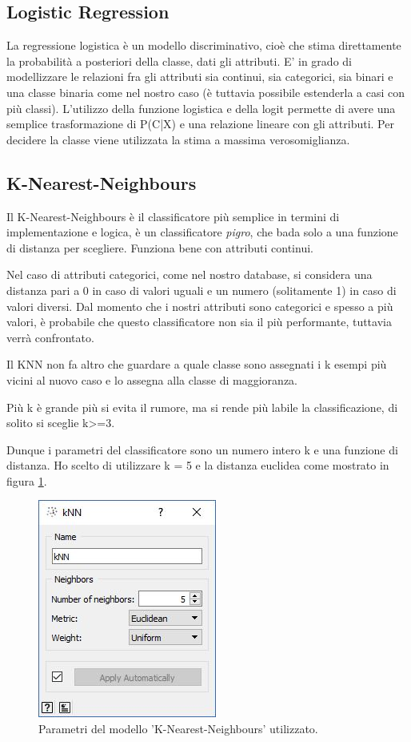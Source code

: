 \documentclass[a4paper, 12p]{report}
\begin{document}
	\subsection{Logistic Regression}
	La regressione logistica è un modello discriminativo, cioè che stima direttamente la probabilità a posteriori della classe, dati gli attributi. E' in grado di modellizzare le relazioni fra gli attributi sia continui, sia categorici, sia binari e una classe binaria come nel nostro caso (è tuttavia possibile estenderla a casi con più classi). L'utilizzo della funzione logistica e della logit permette di avere una semplice trasformazione di P(C|X) e una relazione lineare con gli attributi. Per decidere la classe viene utilizzata la stima a massima verosomiglianza.

	\subsection{K-Nearest-Neighbours}
	Il K-Nearest-Neighbours è il classificatore più semplice in termini di implementazione e logica, è un classificatore \emph{pigro}, che bada solo a una funzione di distanza per scegliere. Funziona bene con attributi continui. 
	
	Nel caso di attributi categorici, come nel nostro database, si considera una distanza pari a 0 in caso di valori uguali e un numero (solitamente 1) in caso di valori diversi. Dal momento che i nostri attributi sono categorici e spesso a più valori, è probabile che questo classificatore non sia il più performante, tuttavia verrà confrontato.
	
	
Il KNN non fa altro che guardare a quale classe sono assegnati i k esempi più vicini al nuovo caso e lo assegna alla classe di maggioranza. 

Più k è grande più si evita il rumore, ma si rende più labile la classificazione, di solito si sceglie k>=3. 

Dunque i parametri del classificatore sono un numero intero k e una funzione di distanza. Ho scelto di utilizzare k = 5 e la distanza euclidea come mostrato in figura \ref{fig:7}.
\begin{figure}	
	\centering
	\includegraphics[scale = 0.8]{img/Knn.JPG}
	\caption{Parametri del modello 'K-Nearest-Neighbours' utilizzato.}\label{fig:7}
\end{figure}	
\end{document}
